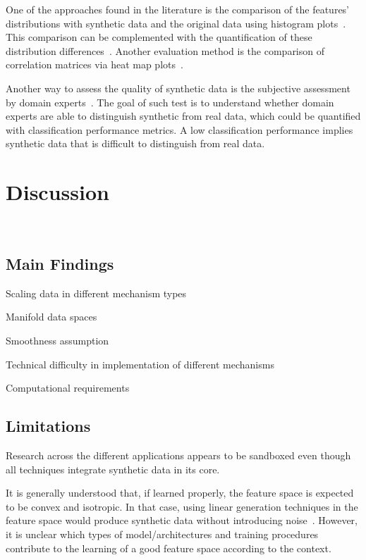 \documentclass[parskip=full]{scrartcl}
\begin{document}
One of the approaches found in the literature is the comparison of the
features' distributions with synthetic data and the original data using
histogram plots~\cite{hittmeir2019utility}. This comparison can be
complemented with the quantification of these distribution
differences~\cite{el2020seven}. Another evaluation method is the comparison of
correlation matrices via heat map plots~\cite{hittmeir2019utility}.

Another way to assess the quality of synthetic data is the subjective
assessment by domain experts~\cite{el2020seven}. The goal of such test is to
understand whether domain experts are able to distinguish synthetic from real
data, which could be quantified with classification performance metrics. A low
classification performance implies synthetic data that is difficult to
distinguish from real data.

\section{Discussion}~\label{sec:discussion}

\subsection{Main Findings}

Scaling data in different mechanism types

Manifold data spaces

Smoothness assumption

Technical difficulty in implementation of different mechanisms

Computational requirements

\subsection{Limitations}

Research across the different applications appears to be sandboxed even though
all techniques integrate synthetic data in its core.

It is generally understood that, if learned properly, the feature space is
expected to be convex and isotropic. In that case, using linear generation
techniques in the feature space would produce synthetic data without
introducing noise~\cite{cheung2020modals}. However, it is unclear which types
of model/architectures and training procedures contribute to the learning of a
good feature space according to the context.
\end{document}
